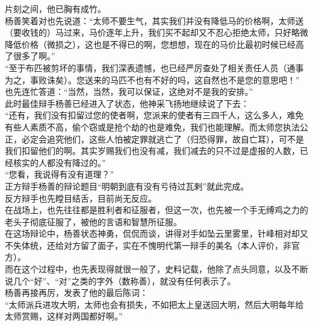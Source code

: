 \begin{multicols}{\theparacolNo}
片刻之间，他已胸有成竹。\\

杨善笑着对也先说道：“太师不要生气，其实我们并没有降低马的价格啊，太师送（要收钱的）马过来，马价逐年上升，我们买不起却又不忍心拒绝太师，只好略微降低价格（微损之），这也是不得已的啊，您想想，现在的马价比最初时候已经高了很多了啊。”\\

“至于布匹被剪坏的事情，我们深表遗憾，也已经严厉查处了相关责任人员（通事为之，事败诛矣）。您送来的马匹不也有不好的吗，这自然也不是您的意思吧！”\\

也先连忙答道：“当然，当然，我可以保证，这绝对不是我的安排。”\\

此时最佳辩手杨善已经进入了状态，他神采飞扬地继续说了下去：\\

“还有，我们没有扣留过您的使者啊，您派来的使者有三四千人，这么多人，难免有些人素质不高，偷个窃或是抢个劫的也是难免，我们也能理解。而太师您执法公正，必定会追究他们，这些人怕被定罪就逃亡了（归恐得罪，故自亡耳），可不是我们扣留他们的啊。其实岁赐我们也没有减，我们减去的只不过是虚报的人数，已经核实的人都没有降过的。”\\

“您看，我说得有没有道理？”\\

正方辩手杨善的辩论题目“明朝到底有没有亏待过瓦剌”就此完成。\\

反方辩手也先瞠目结舌，目前尚无反应。\\

在战场上，也先往往都是胜利者和征服者，但这一次，也先被一个手无缚鸡之力的老头子彻底征服了，被他的言语和智慧所征服。\\

在这场辩论中，杨善状态神勇，侃侃而谈，讲得对手如坠云里雾里，针峰相对却又不失体统，还给对方留了面子，实在不愧明代第一辩手的美名（本人评价，非官方）。\\

而在这个过程中，也先表现得就很一般了，史料记载，他除了点头同意，以及不断说几个“好”、“对”之类的字外（数称善），就没有任何表示了。\\

杨善再接再厉，发表了他的最后陈词：\\

“太师派兵进攻大明，太师也会有损失，不如把太上皇送回大明，然后大明每年给太师赏赐，这样对两国都好啊。”\\


\end{multicols}
